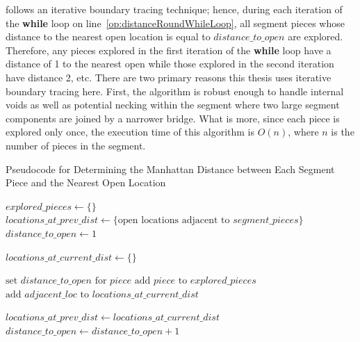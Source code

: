  follows an iterative boundary tracing technique; hence, during each iteration of the \textbf{while} loop on line~\ref{op:distanceRoundWhileLoop}, all segment pieces whose distance to the nearest open location is equal to $distance\_to\_open$ are explored.  Therefore, any pieces explored in the first iteration of the \textbf{while} loop have a distance of 1 to the nearest open while those explored in the second iteration have distance 2, etc. There are two primary reasons this thesis uses iterative boundary tracing here.  First, the algorithm is robust enough to handle internal voids as well as potential necking within the segment where two large segment components are joined by a narrower bridge. What is more, since each piece is explored only once, the execution time of this algorithm is $O(n)$, where $n$ is the number of pieces in the segment.

\begin{algorithm}[tb]
\caption{Pseudocode for Determining the Manhattan Distance between Each Segment Piece and the Nearest Open Location}\label{alg:findDistanceToOpen}
\begin{algorithmic}[1]
    \State $explored\_pieces \gets \{ \}$
    \State $locations\_at\_prev\_dist \gets \{ \text{open locations adjacent to } segment\_pieces \}$
    \State $distance\_to\_open \gets 1$
\item[]
     \label{op:distanceRoundWhileLoop}
        \State $locations\_at\_current\_dist \gets \{ \}$
\item[]
        		
        			\State $\text{set } distance\_to\_open \text{ for } piece$
        			\State $\text{add } piece \text{ to } explored\_pieces$
        			\State $\text{add } adjacent\_loc \text{ to } locations\_at\_current\_dist$
        		\EndIf
        	\EndFor
        \EndFor
\item[]
    \State $locations\_at\_prev\_dist \gets locations\_at\_current\_dist$
    \State $distance\_to\_open \gets distance\_to\_open + 1$
    \EndWhile
\EndProcedure
\end{algorithmic}
\end{algorithm}


